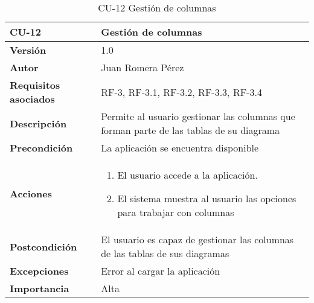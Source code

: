 \begin{table}[p]
    \centering
    \begin{tabularx}{\linewidth}{ p{} p{}}
		\toprule
		\textbf{CU-12}    & \textbf{Gestión de columnas}\\
		\toprule
		\textbf{Versión}              & 1.0    \\
		\textbf{Autor}                & Juan Romera Pérez \\
		\textbf{Requisitos asociados} & RF-3, RF-3.1, RF-3.2, RF-3.3, RF-3.4 \\
		\textbf{Descripción}          & Permite al usuario gestionar las columnas que forman parte de las tablas de su diagrama \\
		\textbf{Precondición}         & La aplicación se encuentra disponible \\
		\textbf{Acciones}             &
		\begin{enumerate}
			\def\labelenumi{\arabic{enumi}.}
			\tightlist
			\item El usuario accede a la aplicación.
            \item El sistema muestra al usuario las opciones para trabajar con columnas
		\end{enumerate}\\
		\textbf{Postcondición}        & El usuario es capaz de gestionar las columnas de las tablas de sus diagramas \\
		\textbf{Excepciones}          & Error al cargar la aplicación \\
		\textbf{Importancia}          & Alta \\
		\bottomrule
    \end{tabularx}
    \caption{CU-12 Gestión de columnas}
\end{table}

